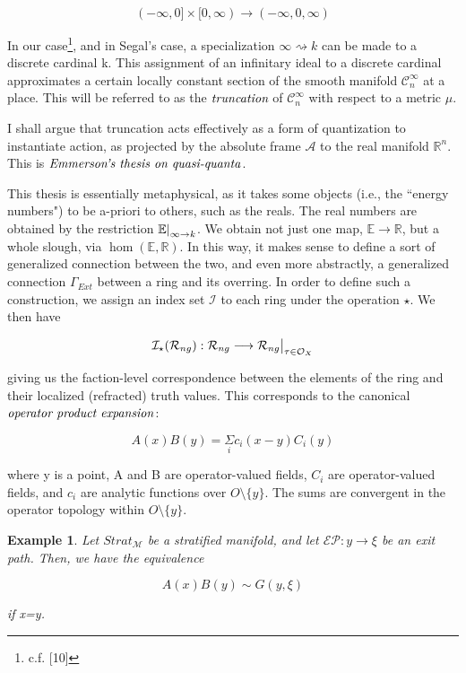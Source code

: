 \documentclass{article}
\newtheorem{eg}{Example}
\newcommand\restr[2]{{%
		\left.\kern-\nulldelimiterspace %
		#1 %
		\littletaller %
		\right|_{#2} %
}}
\newcommand{\littletaller}{\mathchoice{\vphantom{\big|}}{}{}{}}
\begin{document}
	$$(-\infty, 0] \times [0, \infty) \longrightarrow (-\infty,0,\infty)$$
	
	In our case\footnote{c.f. [10]}, and in Segal's case, a specialization $\infty \rightsquigarrow k$ can be made to a discrete cardinal k. This assignment of an infinitary ideal to a discrete cardinal approximates a certain locally constant section of the smooth manifold $\mathcal{C}_n^\infty$ at a place. This will be referred to as the $\emph{truncation}$ of $\mathcal{C}_n^\infty$ with respect to a metric $\mu$. 
	
	I shall argue that truncation acts effectively as a form of quantization to instantiate action, as projected by the absolute frame $\mathscr{A}$ to the real manifold $\mathbb{R}^n$. This is $\emph{Emmerson's thesis on quasi-quanta}$. 
	
	This thesis is essentially metaphysical, as it takes some objects (i.e., the ``energy numbers") to be a-priori to others, such as the reals. The real numbers are obtained by the restriction $\restr{\mathbb{E}}{\infty \to k}$. We obtain not just one map, $\mathbb{E} \longrightarrow \mathbb{R}$, but a whole slough, via $\hom(\mathbb{E},\mathbb{R})$. In this way, it makes sense to define a sort of generalized connection between the two, and even more abstractly, a generalized connection $\Gamma_{Ext}$ between a ring and its overring. In order to define such a construction, we assign an index set $\mathcal{I}$ to each ring under the operation $\star$. We then have
	
	$$\mathcal{I}_\star(\mathcal{R}_{ng}): \mathcal{R}_{ng} \longrightarrow \restr{\mathcal{R}_{ng}}{\tau \in \mathcal{O}_X}$$
	
	giving us the faction-level correspondence between the elements of the ring and their localized (refracted) truth values. This corresponds to the canonical $\emph{operator product expansion}$:
		
		$$A(x)B(y) = \underset{i}{\Sigma}c_i(x-y)C_i(y)$$
		
		where y is a point, A and B are operator-valued fields, $C_i$ are operator-valued fields, and $c_i$ are analytic functions over $O\setminus\{y\}$. The sums are convergent in the operator topology within $O\setminus\{y\}$.
		
		\begin{eg}
			Let $Strat_\mathcal{M}$ be a stratified manifold, and let $\mathcal{EP}: y \longrightarrow \xi$ be an exit path. Then, we have the equivalence 
			
			$$A(x)B(y) \sim G(y,\xi)$$
			
			if x=y.
		\end{eg}
		
\end{document}
